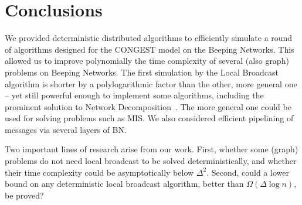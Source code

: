 \section{Conclusions}

We provided deterministic distributed algorithms to efficiently simulate a round of algorithms designed for the CONGEST model on the Beeping Networks. This allowed us to improve polynomially the time complexity of several (also graph) problems on Beeping  Networks. The first simulation by the Local Broadcast algorithm is shorter by a polylogarithmic factor than the other, more general one -- yet still powerful enough to implement some algorithms, including the prominent solution to Network Decomposition~\cite{ghaffari2021improved}.
The more general one could be used for solving problems such as MIS.
We also considered efficient pipelining of messages via several layers of BN.

Two important lines of research arise from our work.
First, whether some (graph) problems do not need local broadcast to be solved deterministically, and whether their time complexity could be asymptotically below $\Delta^2$.
Second, could a lower bound on any deterministic local broadcast algorithm, better than $\Omega(\Delta\log n)$, be proved?


